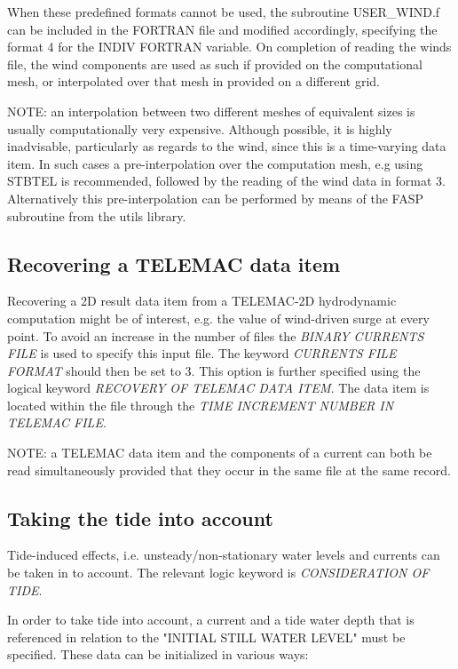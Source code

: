 When these predefined formats cannot be used, the subroutine USER\_WIND.f can be included in the FORTRAN file and modified accordingly,
specifying the format 4 for the INDIV FORTRAN variable. On completion of reading the winds file, the wind components are used as such
if provided on the computational mesh, or interpolated over that mesh in provided on a different grid.

NOTE: an interpolation between two different meshes of equivalent sizes is usually computationally very expensive. Although possible,
it is highly inadvisable, particularly as regards to the wind, since this is a time-varying data item. In such cases a
pre-interpolation over the computation mesh, e.g using STBTEL is recommended, followed by the reading of the wind data in format 3.
Alternatively this pre-interpolation can be performed by means of the FASP subroutine from the utils library.


\subsection{ Recovering a TELEMAC data item}
\label{se:telemacdata}
Recovering a 2D result data item from a TELEMAC-2D hydrodynamic computation might be of interest, e.g. the value of wind-driven
surge at every point. To avoid an increase in the number of files the \textit{BINARY CURRENTS FILE} is used to specify this input file.
The keyword \textit{CURRENTS FILE FORMAT} should then be set to 3. This option is further specified using the logical keyword
\textit{RECOVERY OF TELEMAC DATA ITEM}. The data item is located within the file through the \textit{TIME INCREMENT NUMBER IN TELEMAC
  FILE}.

NOTE: a TELEMAC data item and the components of a current can both be read simultaneously provided that they occur in the same file
at the same record.



\subsection{ Taking the tide into account}
\label{se:tide}
Tide-induced effects, i.e. unsteady/non-stationary water levels and currents can be taken in to account. The relevant logic keyword
is \textit{CONSIDERATION OF TIDE}.

In order to take tide into account, a current and a tide water depth that is referenced in relation to the "INITIAL STILL WATER LEVEL"
must be specified. These data can be initialized in various ways:

